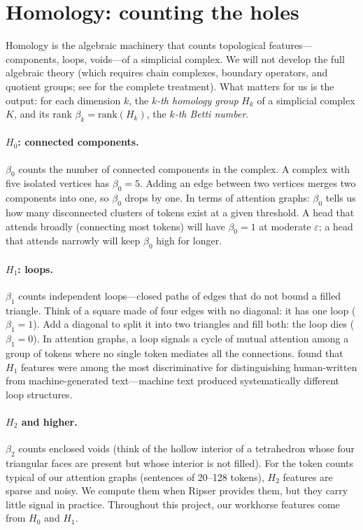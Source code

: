 \section{Homology: counting the holes}
\label{sec:homology}

Homology is the algebraic machinery that counts topological
features---components, loops, voids---of a simplicial complex.
We will not develop the full algebraic theory (which requires chain
complexes, boundary operators, and quotient groups; see
\textcite{edelsbrunner2010} for the complete treatment).
What matters for us is the output: for each dimension $k$, the
\emph{$k$-th homology group} $H_k$ of a simplicial complex $K$, and its
rank $\beta_k = \mathrm{rank}(H_k)$, the \emph{$k$-th Betti number}.

\paragraph{$H_0$: connected components.}
$\beta_0$ counts the number of connected components in the complex.
A complex with five isolated vertices has $\beta_0 = 5$.
Adding an edge between two vertices merges two components into one, so
$\beta_0$ drops by one.
In terms of attention graphs: $\beta_0$ tells us how many disconnected
clusters of tokens exist at a given threshold.
A head that attends broadly (connecting most tokens) will have
$\beta_0 = 1$ at moderate $\varepsilon$;
a head that attends narrowly will keep $\beta_0$ high for longer.

\paragraph{$H_1$: loops.}
$\beta_1$ counts independent loops---closed paths of edges that do not
bound a filled triangle.
Think of a square made of four edges with no diagonal: it has one loop
($\beta_1 = 1$).
Add a diagonal to split it into two triangles and fill both: the loop
dies ($\beta_1 = 0$).
In attention graphs, a loop signals a cycle of mutual attention among a
group of tokens where no single token mediates all the connections.
\textcite{kushnareva2021} found that $H_1$ features were among the most
discriminative for distinguishing human-written from machine-generated
text---machine text produced systematically different loop structures.

\paragraph{$H_2$ and higher.}
$\beta_2$ counts enclosed voids (think of the hollow interior of a
tetrahedron whose four triangular faces are present but whose
interior is not filled).
For the token counts typical of our attention graphs (sentences of
20--128 tokens), $H_2$ features are sparse and noisy.
We compute them when Ripser provides them, but they carry little signal
in practice.
Throughout this project, our workhorse features come from $H_0$ and
$H_1$.


